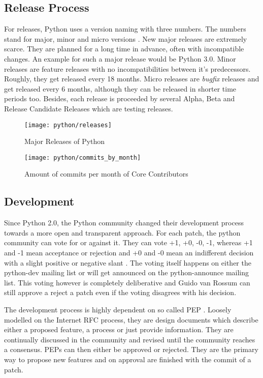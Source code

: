 
\subsection{Release Process} %

For releases, Python uses a version naming with three numbers. The numbers
stand for major, minor and micro versions
\cite{PythonDevelopmentCycle,Warsaw2001}. New major releases are extremely
scarce. They are planned for a long time in advance, often with incompatible
changes. An example for such a major release would be Python 3.0. Minor
releases are feature releases with no incompatibilities between it's
predecessors. Roughly, they get released every 18 months. Micro releases are
\emph{bugfix} releases and get released every 6 months, although they can be
released in shorter time periods too. Besides, each release is proceeded by
several Alpha, Beta and Release Candidate Releases which are testing releases.

\begin{figure}[htbp]
  \centering
  \texttt{[image: python/releases]}
  \caption{Major Releases of Python}
\end{figure}

\begin{figure}[htbp]
  \centering
  \texttt{[image: python/commits\_by\_month]}
  \caption{Amount of commits per month of Core Contributors}
\end{figure}


\subsection{Development} %

Since Python 2.0, the Python community changed their development process
towards a more open and transparent approach. For each patch, the python
community can vote for or against it. They can vote +1, +0, -0, -1, whereas +1
and -1 mean acceptance or rejection and +0 and -0 mean an indifferent decision
with a slight positive or negative slant \cite{Warsaw2002}. The voting itself
happens on either the python-dev mailing list or will get announced on the
python-announce mailing list. This voting however is completely deliberative
and Guido van Rossum can still approve a reject a patch even if the voting
disagrees with his decision.

The development process is highly dependent on so called \ac{PEP}
\cite{Warsaw2000}. Loosely modelled on the Internet RFC process, they are
design documents which describe either a proposed feature, a process or just
provide information. They are continually discussed in the community and
revised until the community reaches a consensus. \acp{PEP} can then either be
approved or rejected. They are the primary way to propose new features and on
approval are finished with the commit of a patch.

